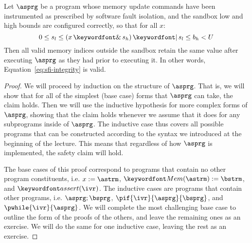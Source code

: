 \documentclass[11pt,twoside]{scrartcl}
\begin{document}
\begin{theorem}
\label{thm:sfi-correctness}
Let $\asprg$ be a program whose memory update commands have been instrumented as prescribed by software fault isolation, and the sandbox low and high bounds are configured correctly, so that for all $x$:
\begin{equation}
\label{eq:bounds-assump}
0 \le s_l \le  (x \bitand s_h) \bitor s_l \le b_h < \maxmem
\end{equation}
Then all valid memory indices outside the sandbox retain the same value after executing $\asprg$ as they had prior to executing it. In other words, Equation~\ref{eq:sfi-integrity} is valid.
\end{theorem}
\begin{proof}
We will proceed by induction on the structure of $\asprg$. That is, we will show that for all of the simplest (base case) forms that $\asprg$ can take, the claim holds. Then we will use the inductive hypothesis for more complex forms of $\asprg$, showing that the claim holds whenever we assume that it does for any subprograms inside of $\asprg$. The inductive case thus covers all possible programs that can be constructed according to the syntax we introduced at the beginning of the lecture. This means that regardless of how $\asprg$ is implemented, the safety claim will hold.

The base cases of this proof correspond to programs that contain no other program constituents, i.e. $x:=\astrm$, $\pderef{\astrm}:=\bstrm$, and $\passert{\ivr}$. The inductive cases are programs that contain other programs, i.e. $\asprg;\bsprg$, $\pif{\ivr}{\asprg}{\bsprg}$, and $\pwhile{\ivr}{\asprg}$. We will complete the most challenging base case to outline the form of the proofs of the others, and leave the remaining ones as an exercise. We will do the same for one inductive case, leaving the rest as an exercise.


\end{proof}
\end{document}
